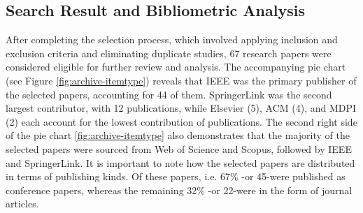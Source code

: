 \subsection{Search Result and Bibliometric Analysis}

After completing the selection process, which involved applying inclusion and exclusion criteria and eliminating duplicate studies, 67 research papers were considered eligible for further review and analysis. The accompanying pie chart (see Figure \ref{fig:archive-itemtype}) reveals that IEEE was the primary publisher of the selected papers, accounting for 44 of them. SpringerLink was the second largest contributor, with 12 publications, while Elsevier (5), ACM (4), and MDPI (2) each account for the lowest contribution of publications. The second right side of the pie chart \ref{fig:archive-itemtype} also demonstrates that the majority of the selected papers were sourced from Web of Science and Scopus, followed by IEEE and SpringerLink. It is important to note how the selected papers are distributed in terms of publishing kinds. Of these papers, i.e. 67\% -or 45-were published as conference papers, whereas the remaining 32\% -or 22-were in the form of journal articles.







